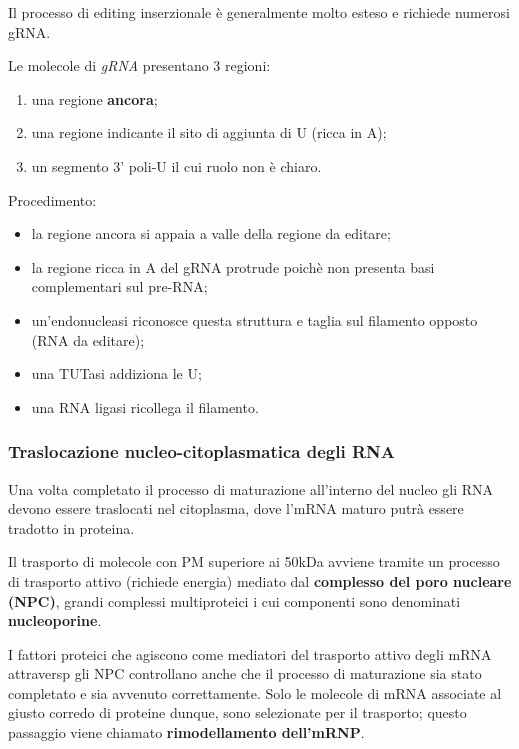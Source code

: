 \documentclass[]{article}
\begin{document}
Il processo di editing inserzionale è generalmente molto esteso e
richiede numerosi gRNA.

Le molecole di \emph{gRNA} presentano 3 regioni:

\begin{enumerate}
\def\labelenumi{\arabic{enumi}.}
\itemsep1pt\parskip0pt
\item
  una regione \textbf{ancora};
\item
  una regione indicante il sito di aggiunta di U (ricca in A);
\item
  un segmento 3' poli-U il cui ruolo non è chiaro.
\end{enumerate}

Procedimento:

\begin{itemize}
\itemsep1pt\parskip0pt
\item
  la regione ancora si appaia a valle della regione da editare;
\item
  la regione ricca in A del gRNA protrude poichè non presenta basi
  complementari sul pre-RNA;
\item
  un'endonucleasi riconosce questa struttura e taglia sul filamento
  opposto (RNA da editare);
\item
  una TUTasi addiziona le U;
\item
  una RNA ligasi ricollega il filamento.
\end{itemize}

\subsubsection{Traslocazione nucleo-citoplasmatica degli
RNA}\label{traslocazione-nucleo-citoplasmatica-degli-rna}

Una volta completato il processo di maturazione all'interno del nucleo
gli RNA devono essere traslocati nel citoplasma, dove l'mRNA maturo
putrà essere tradotto in proteina.

Il trasporto di molecole con PM superiore ai 50kDa avviene tramite un
processo di trasporto attivo (richiede energia) mediato dal
\textbf{complesso del poro nucleare (NPC)}, grandi complessi
multiproteici i cui componenti sono denominati \textbf{nucleoporine}.

I fattori proteici che agiscono come mediatori del trasporto attivo
degli mRNA attraversp gli NPC controllano anche che il processo di
maturazione sia stato completato e sia avvenuto correttamente. Solo le
molecole di mRNA associate al giusto corredo di proteine dunque, sono
selezionate per il trasporto; questo passaggio viene chiamato
\textbf{rimodellamento dell'mRNP}.
\end{document}
